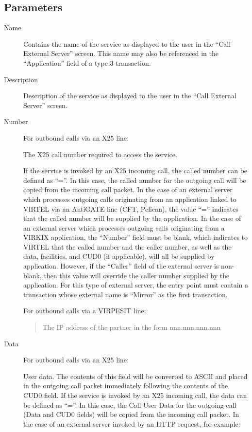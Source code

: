 \documentclass[letterpaper,10pt,english]{sphinxmanual}
\begin{document}
\subsection{Parameters}
\label{\detokenize{connectivity_guide:index-134}}\label{\detokenize{connectivity_guide:id71}}\begin{description}
\item[{Name}] \leavevmode
Contains the name of the service as displayed to the user in the “Call External Server” screen. This name may also be referenced in the “Application” field of a type 3 transaction.

\item[{Description}] \leavevmode
Description of the service as displayed to the user in the “Call External Server” screen.

\item[{Number}] \leavevmode
For outbound calls via an X25 line:

The X25 call number required to access the service.

If the service is invoked by an X25 incoming call, the called number can be defined as “=”. In this case, the called number for the outgoing call will be copied from the incoming call packet. In the case of an external server which processes outgoing calls originating from an application linked to VIRTEL via an AntiGATE line (CFT, Pelican), the value “=” indicates that the called number will be supplied by the application. In the case of an external server which processes outgoing calls originating from a VIRKIX application, the “Number” field must be blank, which indicates to VIRTEL that the called number and the caller number, as well as the data, facilities, and CUD0 (if applicable), will all be supplied by application. However, if the “Caller” field of the external server is non-blank, then this value will override the caller number supplied by the application. For this type of external server, the entry point must contain a transaction whose external name is “Mirror” as the first transaction.

For outbound calls via a VIRPESIT line:
\begin{quote}

The IP address of the partner in the form nnn.nnn.nnn.nnn
\end{quote}

\item[{Data}] \leavevmode
For outbound calls via an X25 line:

User data. The contents of this field will be converted to ASCII and placed in the outgoing call packet immediately following the contents of the CUD0 field. If the service is invoked by an X25 incoming call, the data can be defined as “=”. In this case, the Call User Data for the outgoing call (Data and CUD0 fields) will be copied from the incoming call packet. In the case of an external server invoked by an HTTP request, for example:

\end{description}
\end{document}

